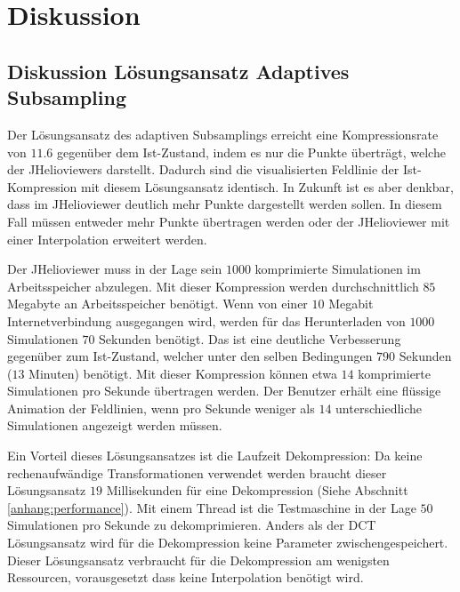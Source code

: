 \section{Diskussion}

\subsection{Diskussion Lösungsansatz Adaptives Subsampling}
Der Lösungsansatz des adaptiven Subsamplings erreicht eine Kompressionsrate von $11.6$ gegenüber dem Ist-Zustand, indem es nur die Punkte überträgt, welche der JHelioviewers darstellt. Dadurch sind die visualisierten Feldlinie der Ist-Kompression mit diesem Lösungsansatz identisch. In Zukunft ist es aber denkbar, dass im JHelioviewer deutlich mehr Punkte dargestellt werden sollen. In diesem Fall müssen entweder mehr Punkte übertragen werden oder der JHelioviewer mit einer Interpolation erweitert werden.

Der JHelioviewer muss in der Lage sein $1000$ komprimierte Simulationen im Arbeitsspeicher abzulegen. Mit dieser Kompression werden durchschnittlich $85$ Megabyte an Arbeitsspeicher benötigt. Wenn von einer $10$ Megabit Internetverbindung ausgegangen wird, werden für das Herunterladen von $1000$ Simulationen $70$ Sekunden benötigt. Das ist eine deutliche Verbesserung gegenüber zum Ist-Zustand, welcher unter den selben Bedingungen $790$ Sekunden ($13$ Minuten) benötigt. Mit dieser Kompression können etwa $14$ komprimierte Simulationen pro Sekunde übertragen werden. Der Benutzer erhält eine flüssige Animation der Feldlinien, wenn pro Sekunde weniger als $14$ unterschiedliche Simulationen angezeigt werden müssen.

Ein Vorteil dieses Lösungsansatzes ist die Laufzeit Dekompression: Da keine rechenaufwändige Transformationen verwendet werden braucht dieser Lösungsansatz $19$ Millisekunden für eine Dekompression (Siehe Abschnitt \ref{anhang:performance}). Mit einem Thread ist die Testmaschine in der Lage $50$ Simulationen pro Sekunde zu dekomprimieren. Anders als der DCT Lösungsansatz wird für die Dekompression keine Parameter zwischengespeichert. Dieser Lösungsansatz verbraucht für die Dekompression am wenigsten Ressourcen, vorausgesetzt dass keine Interpolation benötigt wird.

